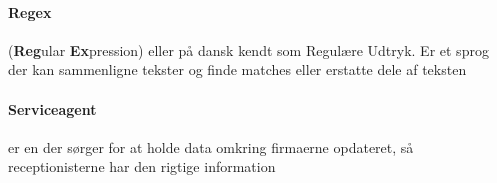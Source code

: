 \paragraph{Regex} (\textbf{Reg}ular \textbf{Ex}pression) eller på dansk kendt som Regulære Udtryk. Er et sprog der kan sammenligne tekster og finde matches eller erstatte dele af teksten

\paragraph{Serviceagent} er en der sørger for at holde data omkring firmaerne opdateret, så receptionisterne har den rigtige information
